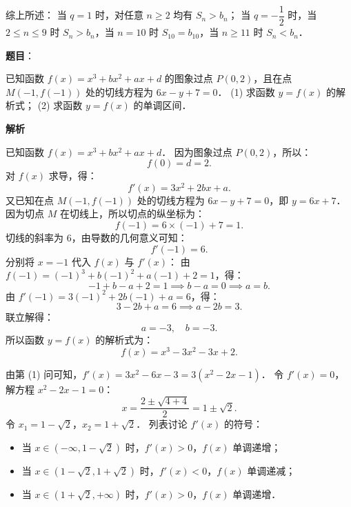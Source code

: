 \begin{answer}
综上所述：
当 $q = 1$ 时，对任意 $n \geqslant 2$ 均有 $S_n > b_n$；
当 $q = -\dfrac{1}{2}$ 时，当 $2 \leqslant n \leqslant 9$ 时 $S_n > b_n$，当 $n = 10$ 时 $S_{10} = b_{10}$，当 $n \geqslant 11$ 时 $S_n < b_n$．



\end{answer}
\begin{answer}

\textbf{题目}：

已知函数 $f(x) = x^3 + bx^2 + ax + d$ 的图象过点 $P(0, 2)$，且在点 $M(-1, f(-1))$ 处的切线方程为 $6x - y + 7 = 0$．
(1) 求函数 $y = f(x)$ 的解析式；
(2) 求函数 $y = f(x)$ 的单调区间．

\textbf{解析}


已知函数 $f(x) = x^3 + bx^2 + ax + d$．
因为图象过点 $P(0, 2)$，所以：
\nopagebreak[4]
\[
f(0) = d = 2.
\]
对 $f(x)$ 求导，得：
\nopagebreak[4]
\[
f'(x) = 3x^2 + 2bx + a.
\]
又已知在点 $M(-1, f(-1))$ 处的切线方程为 $6x - y + 7 = 0$，即 $y = 6x + 7$．
因为切点 $M$ 在切线上，所以切点的纵坐标为：
\nopagebreak[4]
\[
f(-1) = 6 \times (-1) + 7 = 1.
\]
切线的斜率为 6，由导数的几何意义可知：
\nopagebreak[4]
\[
f'(-1) = 6.
\]
分别将 $x = -1$ 代入 $f(x)$ 与 $f'(x)$：
由 $f(-1) = (-1)^3 + b(-1)^2 + a(-1) + 2 = 1$，得：
\nopagebreak[4]
\[
-1 + b - a + 2 = 1 \implies b - a = 0 \implies a = b.
\]
由 $f'(-1) = 3(-1)^2 + 2b(-1) + a = 6$，得：
\nopagebreak[4]
\[
3 - 2b + a = 6 \implies a - 2b = 3.
\]
联立解得：
\nopagebreak[4]
\[
a = -3, \quad b = -3.
\]
所以函数 $y = f(x)$ 的解析式为：
\nopagebreak[4]
\[
f(x) = x^3 - 3x^2 - 3x + 2.
\]


由第 (1) 问可知，$f'(x) = 3x^2 - 6x - 3 = 3(x^2 - 2x - 1)$．
令 $f'(x) = 0$，解方程 $x^2 - 2x - 1 = 0$：
\nopagebreak[4]
\[
x = \frac{2 \pm \sqrt{4 + 4}}{2} = 1 \pm \sqrt{2}.
\]
令 $x_1 = 1 - \sqrt{2}$，$x_2 = 1 + \sqrt{2}$．
列表讨论 $f'(x)$ 的符号：
\begin{itemize}
\item 当 $x \in (-\infty, 1 - \sqrt{2})$ 时，$f'(x) > 0$，$f(x)$ 单调递增；
\item 当 $x \in (1 - \sqrt{2}, 1 + \sqrt{2})$ 时，$f'(x) < 0$，$f(x)$ 单调递减；
\item 当 $x \in (1 + \sqrt{2}, +\infty)$ 时，$f'(x) > 0$，$f(x)$ 单调递增．
\end{itemize}


\end{answer}
